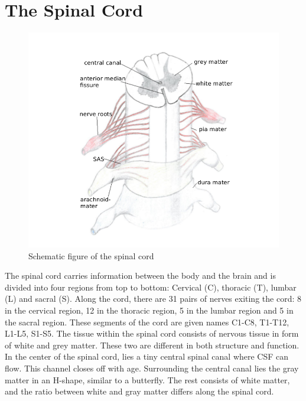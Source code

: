 \section{The Spinal Cord}
\begin{figure}[!ht]
\includegraphics[scale=0.3]{figures/Spinal_Cord}
\caption{Schematic figure of the spinal cord}
\end{figure}
The spinal cord carries information between the body and the brain and is divided into four regions from top to bottom: Cervical (C), thoracic (T), lumbar (L) and sacral (S). Along the cord, there are 31 pairs of nerves exiting the cord: 8 in the cervical region, 12 in the thoracic region, 5 in the lumbar region and 5 in the sacral region. These segments of the cord are given names C1-C8, T1-T12, L1-L5, S1-S5. The tissue within the spinal cord consists of nervous tissue in form of white and grey matter. These two are different in both structure and function. In the center of the spinal cord, lies a tiny central spinal canal where CSF can flow. This channel closes off with age. Surrounding the central canal lies the gray matter in an H-shape, similar to a butterfly. The rest consists of white matter, and the ratio between white and gray matter differs along the spinal cord. 
